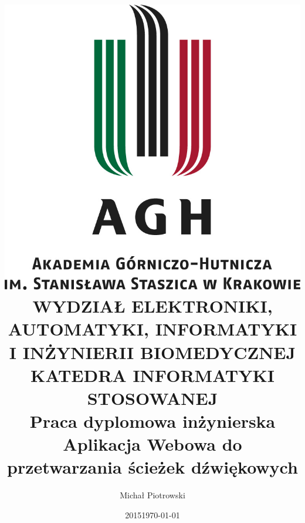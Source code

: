 \documentclass[11pt]{aghdpl}
\date{2015}
\begin{document}
{
	\fancyhf{}
	\renewcommand{\headrulewidth}{0pt}
	\renewcommand{\footrulewidth}{0pt}
}

\setcounter{tocdepth}{2}
\graphicspath{ {images/} }
\clearpage
\title{
{\includegraphics[scale=0.8]{LogoAGH.jpg}  }\\
{\selectfont \large \textbf{WYDZIAŁ ELEKTRONIKI, AUTOMATYKI, INFORMATYKI I INŻYNIERII BIOMEDYCZNEJ \\
KATEDRA INFORMATYKI STOSOWANEJ}}\\
{Praca dyplomowa inżynierska} \\
{Aplikacja Webowa do przetwarzania ścieżek dźwiękowych}
}
\date{\today}
\author{Michał Piotrowski}
\end{document}

